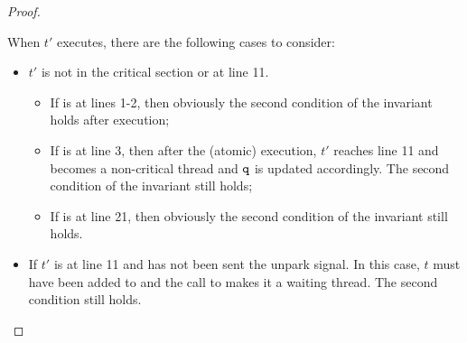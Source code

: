 \documentclass{article}[10pt]
\begin{document}
\begin{proof}
\begin{itemize}
\begin{itemize}
\begin{itemize}
      \end{itemize}

    \end{itemize}
    When $t'$ executes, there are the following cases to consider:
    \begin{itemize}
    \item $t'$ is not in the critical section or at line 11. 

      \begin{itemize}
      \item If  is at lines 1-2, then obviously the second
        condition of the invariant holds after execution;

      \item If  is at line 3, then after the (atomic)
        execution, $t'$ reaches line 11 and becomes a non-critical
        thread and $\text{\ttfamily q}$ is updated accordingly. The second condition
        of the invariant still holds;

      \item If  is at line 21, then obviously the second
        condition of the invariant still holds.
      \end{itemize}

    \item 
      If $t'$ is at line 11 and has not been sent the unpark signal.
      In this case, $t$ must have been added to \kq and the call to
      \kpark makes it a waiting thread. The second condition still
      holds.
    \end{itemize}
  \end{itemize}
  
\end{proof}
\end{document}
